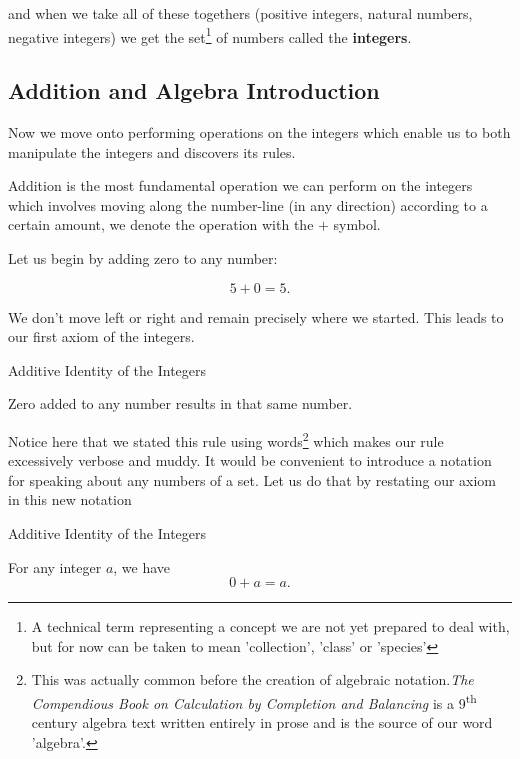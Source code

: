 and when we take all of these togethers (positive integers, natural numbers, negative integers) we get the
set\footnote{A technical term representing a concept we are not yet prepared to deal with, but for now
can be taken to mean 'collection', 'class' or 'species' } of numbers called the \textbf{integers}.

\newpage

\subsection{Addition and Algebra Introduction}

\begin{introduction}
  Now we move onto performing operations on the integers which enable us to both manipulate the integers and
  discovers its rules.
\end{introduction}

Addition is the most fundamental operation we can perform on the integers which involves moving along the
number-line (in any direction) according to a certain amount, we denote the operation with the $+$ symbol.

Let us begin by adding zero to any number:

$$
  5 + 0 = 5.
$$

We don't move left or right and remain precisely where we started. This leads to our first axiom of the integers.

\begin{axiom}{Additive Identity of the Integers}

  Zero added to any number results in that same number.

\end{axiom}

Notice here that we stated this rule using words\footnote{This was actually common before the creation of
algebraic notation.\textit{The Compendious Book on Calculation by Completion and Balancing} is a 9\textsuperscript{th}
century algebra text written entirely in prose and is the source of our word 'algebra'.} which makes our rule
excessively verbose and muddy. It would be convenient to introduce a notation for speaking about any numbers of a set.
Let us do that by restating our axiom in this new notation

\setcounter{axiom}{0}
\begin{axiom}{Additive Identity of the Integers}

  For any integer $a$, we have
  $$
    0 + a = a.
  $$
\end{axiom}

